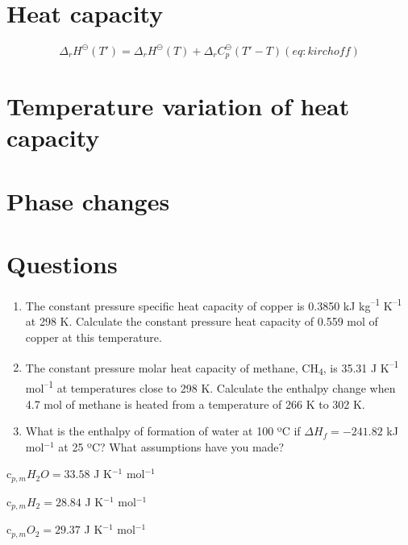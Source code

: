 \documentclass[
]{book}
\begin{document}
\hypertarget{heat-capacity}{%
\section{Heat capacity}\label{heat-capacity}}

\begin{equation}
\Delta_r H^{\ominus} (T')=\Delta_r H^{\ominus} (T) + \Delta_r C_p^{\ominus} (T'-T)
(eq:kirchoff)
\end{equation}

\hypertarget{temperature-variation-of-heat-capacity}{%
\section{Temperature variation of heat capacity}\label{temperature-variation-of-heat-capacity}}

\hypertarget{phase-changes}{%
\section{Phase changes}\label{phase-changes}}

\hypertarget{questions}{%
\section{Questions}\label{questions}}

\begin{enumerate}
\def\labelenumi{\arabic{enumi}.}
\item
  The constant pressure specific heat capacity of copper is 0.3850 kJ kg\textsuperscript{--1} K\textsuperscript{--1} at 298 K. Calculate the constant pressure heat capacity of 0.559 mol of copper at this temperature.
\item
  The constant pressure molar heat capacity of methane, CH\textsubscript{4}, is 35.31 J K\textsuperscript{--1} mol\textsuperscript{--1} at temperatures close to 298 K. Calculate the enthalpy change when 4.7 mol of methane is heated from a temperature of 266 K to 302 K.
\item
  What is the enthalpy of formation of water at 100 ºC if \(\Delta H_f = -241.82\) kJ mol\(^{-1}\) at 25 ºC? What assumptions have you made?
\end{enumerate}

c\(_{p,m} H_2 O = 33.58\) J K\(^{-1}\) mol\(^{-1}\)

c\(_{p,m} H_2 = 28.84\) J K\(^{-1}\) mol\(^{-1}\)

c\(_{p,m} O_2 = 29.37\) J K\(^{-1}\) mol\(^{-1}\)
\end{document}

